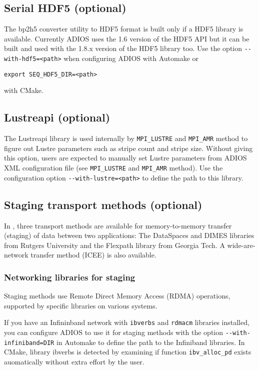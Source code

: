 \subsection{Serial HDF5 (optional)}

The bp2h5 converter utility to HDF5 format is built only if a HDF5 library is available.
Currently ADIOS uses the 1.6 version of the HDF5 API but it can be built and used
with the 1.8.x version of the HDF5 library too. Use the option \verb+--with-hdf5=<path>+
when configuring ADIOS with Automake or
\begin{lstlisting}
export SEQ_HDF5_DIR=<path>
\end{lstlisting}
\noindent with CMake.

\subsection{Lustreapi (optional)}

The Lustreapi library is used internally by \verb+MPI_LUSTRE+ and \verb+MPI_AMR+ method to
figure out Lustre parameters such as stripe count and stripe size.  Without giving
this option, users are expected to manually set Lustre parameters from ADIOS XML
configuration file (see \verb+MPI_LUSTRE+ and \verb+MPI_AMR+ method).
Use the configuration option
\verb+--with-lustre=<path>+ to define the path to this library.

\subsection{Staging transport methods (optional)}

In \adiosversion, three transport methods
are available for memory-to-memory transfer (staging) of data between two
applications: The DataSpaces and DIMES libraries from Rutgers University and
the Flexpath library from Georgia Tech. A wide-are-network transfer method (ICEE) is also available.

\subsubsection{Networking libraries for staging}

Staging methods use Remote Direct Memory Access (RDMA) operations, supported by specific libraries
on various systems.

\vspace*{6pt}
If you have an Infininband network with \verb+ibverbs+ and \verb+rdmacm+ libraries installed, you can configure ADIOS to use it for staging methods with the option
\verb+--with-infiniband=DIR+  in Automake to define the path to the Infiniband libraries. In CMake, library ibverbs is detected by examining if function \verb+ibv_alloc_pd+ exists auomatically without extra effort by the user.

